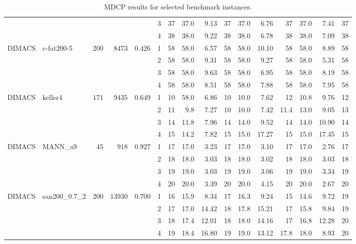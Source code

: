 \documentclass[draft,final]{vutinfth} %
\begin{document}
\begin{table}
{\begin{tabular}{llrrrr | rrr rrr rrr r}
               &          &      &       &         & 3 & 37 & 37.0 & 9.13 & 37 & 37.0 & 6.76 & 37 & 37.0 & 7.41 & 37\\
               &          &      &       &         & 4 & 38 & 38.0 & 9.22 & 38 & 38.0 & 6.78 & 38 & 38.0 & 7.09 & 38\\
        DIMACS & c-fat200-5 & $200$ & $8473$ & $0.426$ & 1 & 58 & 58.0 & 6.57 & 58 & 58.0 & 10.10 & 58 & 58.0 & 8.89 & 58\\
        &          &      &       &                    & 2 & 58 & 58.0 & 9.31 & 58 & 58.0 & 9.27 & 58 & 58.0 & 5.31 & 58\\
        &          &      &       &                    & 3 & 58 & 58.0 & 9.63 & 58 & 58.0 & 6.95 & 58 & 58.0 & 8.19 & 58\\
        &          &      &       &                    & 4 & 58 & 58.0 & 8.51 & 58 & 58.0 & 7.88 & 58 & 58.0 & 7.95 & 58\\
        DIMACS & keller4 & $171$ & $9435$ & $0.649$    & 1 & 10 & 58.0 & 6.86 & 10 & 10.0 & 7.62 & 12 & 10.8 & 9.76 & 12\\
        &          &      &       &                    & 2 & 11 & 9.8 & 7.27 & 10 & 10.0 & 7.42 & 11.4 & 13.0 & 9.05 & 13\\
        &          &      &       &                    & 3 & 14 & 11.8 & 7.96 & 14 & 14.0 & 9.52 & 14 & 14.0 & 10.90 & 14\\
        &          &      &       &                    & 4 & 15 & 14.2 & 7.82 & 15 & 15.0 & 17.27 & 15 & 15.0 & 17.45 & 15\\
        DIMACS & MANN\_a9 & $45$ & $918$ & $0.927$ & 1 & 17 & 17.0 & 3.23 & 17 & 17.0 & 3.10 & 17 & 17.0 & 2.76 & 17\\
               &          &      &       &         & 2 & 18 & 18.0 & 3.03 & 18 & 18.0 & 3.02 & 18 & 18.0 & 3.03 & 18\\
               &          &      &       &         & 3 & 19 & 19.0 & 3.03 & 19 & 19.0 & 3.06 & 19 & 19.0 & 3.34 & 19\\
               &          &      &       &         & 4 & 20 & 20.0 & 3.39 & 20 & 20.0 & 4.15 & 20 & 20.0 & 2.67 & 20\\
        DIMACS & san200\_0.7\_2 & $200$ & $13930$ & $0.700$   & 1 & 16 & 15.9 & 8.34 & 17 & 16.3 & 9.24 & 15 & 14.6 & 9.72 & 19\\
               &          &      &       &                    & 2 & 17 & 17.0 & 14.42 & 18 & 17.8 & 15.21 & 17 & 15.8 & 9.84 & 19\\
               &          &      &       &                    & 3 & 18 & 17.4 & 12.01 & 18 & 18.0 & 14.16 & 17 & 16.8 & 12.28 & 20\\
               &          &      &       &                    & 4 & 19 & 18.4 & 16.80 & 19 & 19.0 & 13.12 & 17.8 & 18.0 & 8.93 & 20\\
        
        
    \end{tabular}
    }
    \caption{MDCP results for selected benchmark instances.}
    \label{tab:mdcp-benchmark}
\end{table}
\end{document}
